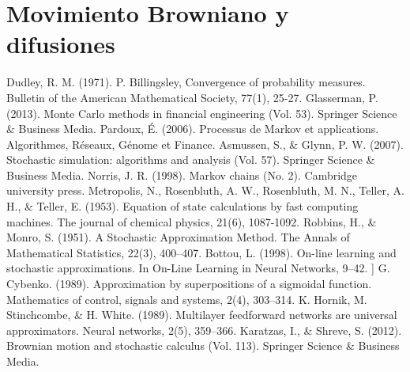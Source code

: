 \documentclass[letterpaper,11pt]{article} %
\theoremstyle{defbreak}
\theoremstyle{propbreak}
\theoremstyle{remark}
\theoremstyle{break}
\begin{document}


\newpage
\section{Movimiento Browniano y difusiones}


\newpage
\begin{references}
 Dudley, R. M. (1971). P. Billingsley, Convergence of probability measures. Bulletin of the American Mathematical Society, 77(1), 25-27.
 Glasserman, P. (2013). Monte Carlo methods in financial engineering (Vol. 53). Springer Science \& Business Media.
 Pardoux, É. (2006). Processus de Markov et applications. Algorithmes, Réseaux, Génome et Finance.
 Asmussen, S., \& Glynn, P. W. (2007). Stochastic simulation: algorithms and analysis (Vol. 57). Springer Science \& Business Media.
 Norris, J. R. (1998). Markov chains (No. 2). Cambridge university press.
 Metropolis, N., Rosenbluth, A. W., Rosenbluth, M. N., Teller, A. H., \& Teller, E. (1953). Equation of state calculations by fast computing machines. The journal of chemical physics, 21(6), 1087-1092.
 Robbins, H., \& Monro, S. (1951). A Stochastic Approximation Method. The Annals of Mathematical Statistics, 22(3), 400–407.
 Bottou, L. (1998). On-line learning and stochastic approximations. In On-Line Learning in Neural Networks, 9–42.
 ] G. Cybenko. (1989). Approximation by superpositions of a sigmoidal function. Mathematics of control, signals and systems, 2(4), 303–314.
 K. Hornik, M. Stinchcombe, \& H. White. (1989). Multilayer feedforward networks are universal approximators. Neural networks, 2(5), 359–366.
 Karatzas, I., \& Shreve, S. (2012). Brownian motion and stochastic calculus (Vol. 113). Springer Science & Business Media.
\end{references}
\end{document}
